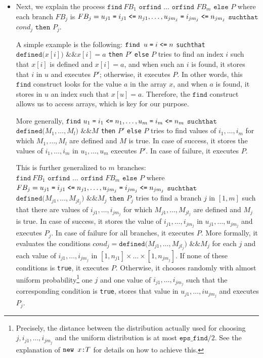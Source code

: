 \begin{itemize}
\item 
Next, we explain the process 
$\texttt{find}\ FB_1 \texttt{ orfind }\ldots\texttt{ orfind }FB_m \texttt{ else } P$ where each branch $FB_j$ is $FB_j = u_{j1} \mathrel{\texttt{=}}  i_{j1} \mathrel{\texttt{<=}}  n_{j1}, \ldots, u_{jm_j} \mathrel{\texttt{=}}  i_{jm_j} \mathrel{\texttt{<=}}  n_{jm_j}$ $\texttt{suchthat}$ $cond_j$ $\texttt{then}$ $P_j$.

A simple example is the following:
$\texttt{find }u \mathrel{\texttt{=}}  i \mathrel{\texttt{<=}}  n$ \texttt{suchthat} $\texttt{defined(}x[i]\texttt{) \&\& }x[i] = a$ \texttt{then} $P'$ \texttt{else} $P$
tries to find an index $i$ such that $x[i]$ is defined and
$x[i] = a$, and when such an $i$ is found,
it stores that $i$ in $u$ and executes $P'$;
otherwise, it executes $P$.
In other words, this $\texttt{find}$ construct looks for the value
$a$ in the array $x$, and when $a$ is found, it stores in
$u$ an index such that $x[u] = a$. Therefore, the $\texttt{find}$ construct
allows us to access arrays, which is key for our purpose.

More generally, $\texttt{find}\ u_{1} \mathrel{\texttt{=}}  i_1 \mathrel{\texttt{<=}}  n_{1}, \ldots, u_{m} \mathrel{\texttt{=}}  i_m \mathrel{\texttt{<=}}  n_{m}$ $\texttt{suchthat}$ $\texttt{defined(}M_{1}, \ldots, M_{l}\texttt{) \&\& } M$ \texttt{then} $P'$ \texttt{else} $P$ tries to find values of $i_1, \ldots, i_m$ for which
$M_1, \ldots, M_l$ are defined and $M$ is true. In case of success, it
stores the values of $i_1, \ldots, i_m$ in $u_1, \ldots, u_m$
executes $P'$. In case of failure, it executes $P$.

This is further generalized to $m$ branches: 
$\texttt{find}\ FB_1 \texttt{ orfind }\ldots\texttt{ orfind }FB_m \texttt{ else } P$
where $FB_j = u_{j1} \mathrel{\texttt{=}}  i_{j1} \mathrel{\texttt{<=}}  n_{j1}, \ldots, u_{jm_j} \mathrel{\texttt{=}}  i_{jm_j} \mathrel{\texttt{<=}}  n_{jm_j}$ $\texttt{suchthat}$ $\texttt{defined(}M_{j1}, \ldots, M_{jl_j}\texttt{) \&\& }M_j$ $\texttt{then}$ $P_j$
tries to find a branch $j$ in $[1,m]$ such that there are 
values of $i_{j1}, \ldots, i_{jm_j}$ for which 
$M_{j1}, \ldots, M_{jl_j}$ are defined and $M_j$ is true. In case of 
success, it stores the value of $i_{j1}, \ldots, i_{jm_j}$ in $u_{j1}, \ldots, u_{jm_j}$ and executes $P_j$.
In case of failure for all branches, it executes $P$. 
More formally, it evaluates the conditions
$cond_j = \texttt{defined(}M_{j1}, \ldots, M_{jl_j}\texttt{) \&\& }M_j$ for each $j$ and
each value of $i_{j1}, \ldots, i_{jm_j}$ in $[1, n_{j1}] 
\times \ldots \times [1, n_{jm_j}]$.
If none of these conditions is \texttt{true}, it executes $P$.
Otherwise, it chooses randomly with almost uniform 
probability\footnote{Precisely, the distance between the distribution actually
used for choosing $j, i_{j1}, \ldots, i_{jm_j}$ and the uniform
distribution is at most $\texttt{eps\_find}/2$. See the explanation of $\texttt{new\ }{x}\texttt{:}{T}$
for details on how to achieve this.}
one $j$ and one value of $i_{j1}, \ldots, i_{jm_j}$
such that the corresponding condition is \texttt{true},
stores that value in $u_{j1}, \ldots, iu_{jm_j}$ and executes $P_j$.


\end{itemize}
